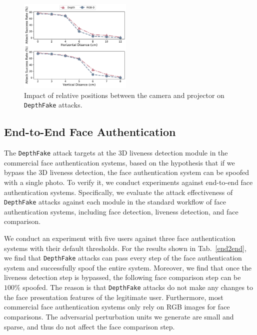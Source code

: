 \begin{figure}[pt]
	\centerline{\includegraphics[width = 0.48\textwidth]{figures/related_position.pdf}}
	\vspace{-0.1in}
	\caption{Impact of relative positions between the camera and projector on \texttt{DepthFake} attacks. }
	\label{realted_position}
	\vspace{-0.1in}
\end{figure}



\subsection{End-to-End Face Authentication}

The \texttt{DepthFake} attack targets at the 3D liveness detection module in the commercial face authentication systems, based on the hypothesis that if we bypass the 3D liveness detection,  the face authentication system can be spoofed with a single photo.
To verify it,  we conduct experiments against end-to-end face authentication systems. Specifically, we evaluate the attack effectiveness of \texttt{DepthFake} attacks against each module in the standard workflow of face authentication systems, including face detection, liveness detection, and face comparison. 

We conduct an experiment with five users against three face authentication systems with their default thresholds.
For the results shown in Tab.~\ref{end2end}, we find that \texttt{DepthFake} attacks can pass every step of the face authentication system and successfully spoof the entire system. Moreover, we find that once the liveness detection step is bypassed, the following face comparison step can be $100\%$ spoofed. The reason is that \texttt{DepthFake} attacks do not make any changes to the face presentation features of the legitimate user. Furthermore, most commercial face authentication systems only rely on RGB images for face comparisons. The adversarial perturbation units we generate are small and sparse, and thus do not affect the face comparison step.


